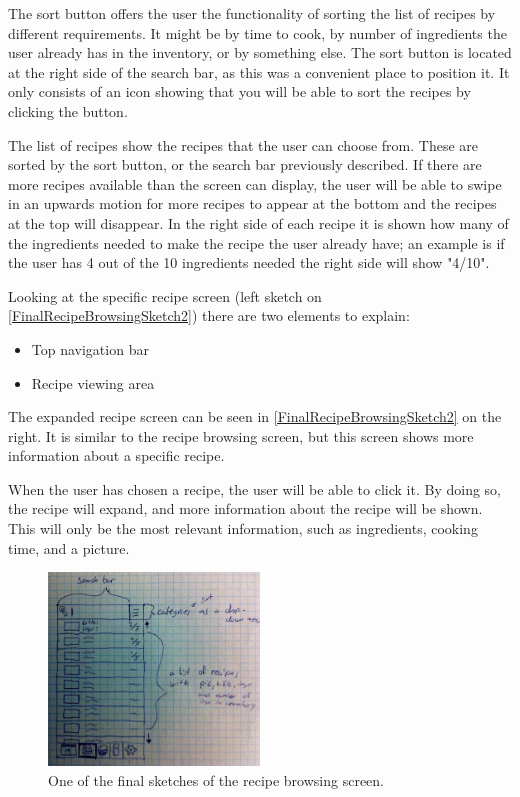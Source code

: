 The sort button offers the user the functionality of sorting the list of recipes by different requirements. It might be by time to cook, by number of ingredients the user already has in the inventory, or by something else. The sort button is located at the right side of the search bar, as this was a convenient place to position it. It only consists of an icon showing that you will be able to sort the recipes by clicking the button.

The list of recipes show the recipes that the user can choose from. These are sorted by the sort button, or the search bar previously described. If there are more recipes available than the screen can display, the user will be able to swipe in an upwards motion for more recipes to appear at the bottom and the recipes at the top will disappear. In the right side of each recipe it is shown how many of the ingredients needed to make the recipe the user already have; an example is if the user has 4 out of the 10 ingredients needed the right side will show "4/10".

Looking at the specific recipe screen (left sketch on \cref{FinalRecipeBrowsingSketch2}) there are two elements to explain:

\begin{itemize}
\item Top navigation bar
\item Recipe viewing area
\end{itemize} 

The expanded recipe screen can be seen in \cref{FinalRecipeBrowsingSketch2} on the right. It is similar to the recipe browsing screen, but this screen shows more information about a specific recipe.

When the user has chosen a recipe, the user will be able to click it. By doing so, the recipe will expand, and more information about the recipe will be shown. This will only be the most relevant information, such as ingredients, cooking time, and a picture.

\begin{figure}[H]
    \centering
    \includegraphics[width=0.5\textwidth]{Grafik/FoodPlanner/FinalRecipeBrowsingSketch1}
    \caption{One of the final sketches of the recipe browsing screen.}
    \label{FinalRecipeBrowsingSketch1}
\end{figure}

